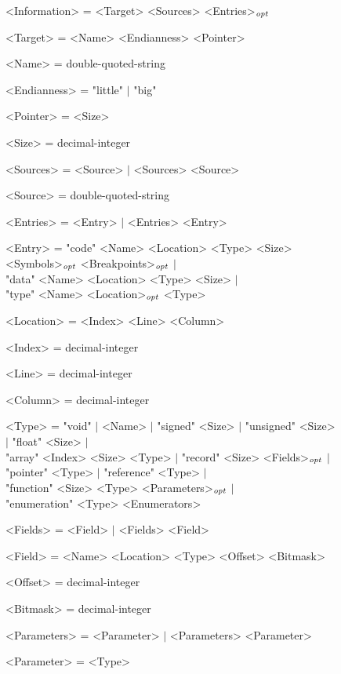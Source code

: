 \begin{figure}
\centering\ifbook\small\fi\setlength{\grammarparsep}{0ex}
\begin{minipage}{34em}\begin{grammar}
<Information> = <Target> <Sources> <Entries>$_\mathit{opt}$ \par
<Target> = <Name> <Endianness> <Pointer> \par
<Name> = double-quoted-string \par
<Endianness> = "little" $\mid$ "big" \par
<Pointer> = <Size> \par
<Size> = decimal-integer \par
<Sources> = <Source> $\mid$ <Sources> <Source> \par
<Source> = double-quoted-string \par
<Entries> = <Entry> $\mid$ <Entries> <Entry> \par
<Entry> = "code" <Name> <Location> <Type> <Size> <Symbols>$_\mathit{opt}$ <Breakpoints>$_\mathit{opt}$ $\mid$ \\ "data" <Name> <Location> <Type> <Size> $\mid$ \\ "type" <Name> <Location>$_\mathit{opt}$ <Type> \par
<Location> = <Index> <Line> <Column> \par
<Index> = decimal-integer \par
<Line> = decimal-integer \par
<Column> = decimal-integer \par
<Type> = "void" $\mid$ <Name> $\mid$ "signed" <Size> $\mid$ "unsigned" <Size> $\mid$ "float" <Size> $\mid$ \\ "array" <Index> <Size> <Type> $\mid$ "record" <Size> <Fields>$_\mathit{opt}$ $\mid$ \\ "pointer" <Type> $\mid$ "reference" <Type> $\mid$ \\ "function" <Size> <Type> <Parameters>$_\mathit{opt}$ $\mid$ \\ "enumeration" <Type> <Enumerators> \par
<Fields> = <Field> $\mid$ <Fields> <Field> \par
<Field> = <Name> <Location> <Type> <Offset> <Bitmask> \par
<Offset> = decimal-integer \par
<Bitmask> = decimal-integer \par
<Parameters> = <Parameter> $\mid$ <Parameters> <Parameter> \par
<Parameter> = <Type> \par

\end{grammar}
\end{minipage}
\end{figure}
